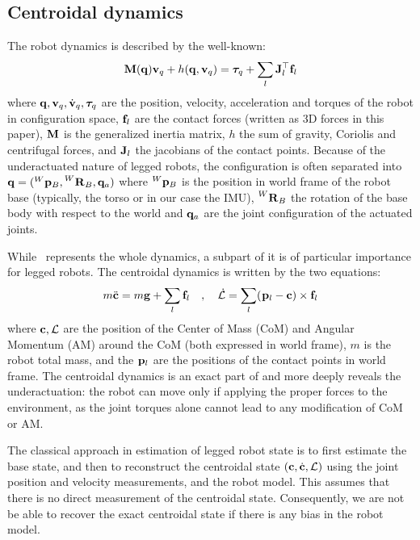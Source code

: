 \subsection{Centroidal dynamics}
\label{sec:centroidal_dynamics}
The robot dynamics is described by the well-known:
\begin{equation}\label{eq:wbdyn}
  {\bf M}({\bf q}) {\bf v}_q + h({\bf q},{\bf v}_q) = \bm\tau_q + \sum_l {\bf J}_l^{\top} {\bf f}_l
\end{equation}
where ${\bf q},{\bf v}_q,\dot{{\bf v}}_q,\bm\tau_q$ are the position, velocity, acceleration and torques of the robot in configuration space,
${\bf f}_l$ are the contact forces (written as 3D forces in this paper),
${\bf M}$ is the generalized inertia matrix, $h$ the sum of gravity, Coriolis and centrifugal forces, and ${\bf J}_l$ the jacobians of the contact points.
Because of the underactuated nature of legged robots, the configuration is often separated into ${\bf q}=(\prescript{W}{}{{\bf p}}_{B},\prescript{W}{}{{\bf R}}_{B},{\bf q}_a)$ where $\prescript{W}{}{{\bf p}}_{B}$ 
is the position in world frame of the robot base (typically, the torso or in our case the IMU), $\prescript{W}{}{{\bf R}}_{B}$ the rotation of the base body with respect 
to the world and ${\bf q}_a$ are the joint configuration of the actuated joints. 

While~ represents the whole dynamics, a subpart of it is of particular importance for legged robots.
The centroidal dynamics is written by the two equations:
%
\begin{equation}
    m \ddot{{\bf c}} = m {\bf g} + \sum_l {\bf f}_l \quad , \quad
\mathcal{\dot{L}} = \sum_l (\prescript{}{}{{\bf p}}_{l} - {\bf c}) \times {\bf f}_l
\label{eq:NewtonEuler}
\end{equation}
%
where ${\bf c},\mathcal{L}$ are the position of the Center of Mass (CoM) and Angular Momentum (AM) around the CoM (both expressed in world frame), $m$ is the robot total mass, 
and the $\prescript{}{}{{\bf p}}_{l}$ are the positions of the contact points in world frame. The centroidal dynamics is an exact part of  and more deeply reveals 
the underactuation: the robot can move only if applying the proper forces to the environment, as the joint torques alone cannot lead to any modification 
of CoM or AM.


The classical approach in estimation of legged robot state is to first estimate the base state, and then to reconstruct the centroidal state $({\bf c},\dot{{\bf c}},\mathcal{L})$ using the joint position and velocity measurements, and the robot model.
This assumes that there is no direct measurement of the centroidal state.
Consequently, we are not be able to recover the exact centroidal state if there is any bias in the robot model.

